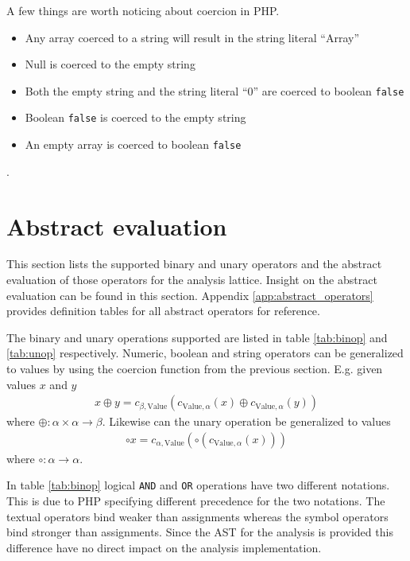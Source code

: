 A few things are worth noticing about coercion in PHP. 
\begin{itemize}
\item Any array coerced to a string will result in the string literal ``Array''
\item Null is coerced to the empty string
\item Both the empty string and the string literal ``0'' are coerced to boolean \texttt{false}
\item Boolean \texttt{false} is coerced to the empty string
\item An empty array is coerced to boolean \texttt{false}
\end{itemize}. 
\section{Abstract evaluation}
\label{sec:abseval}
This section lists the supported binary and unary operators and the abstract evaluation of those operators for the analysis lattice. Insight on the abstract evaluation can be found in this section. Appendix \ref{app:abstract_operators} provides definition tables for all abstract operators for reference.

The binary and unary operations supported are listed in table \ref{tab:binop} and \ref{tab:unop} respectively. Numeric, boolean and string operators can be generalized to values by using the coercion function from the previous section. E.g. given values $x$ and $y$
\begin{align*}
    x \oplus y =  c_{\beta, \text{Value}}(c_{\text{Value}, \alpha}(x) \oplus c_{\text{Value},\alpha}(y))
\end{align*}
where $\oplus : \alpha \times \alpha \rightarrow \beta$. Likewise can the unary operation be generalized to values 
\begin{align*}
    \circ x = c_{\alpha, \text{Value}}(\circ (c_{\text{Value}, \alpha}(x)))
\end{align*}
where $\circ : \alpha \rightarrow \alpha $.


In table \ref{tab:binop} logical \texttt{AND} and \texttt{OR} operations have two different notations. This is due to PHP specifying different precedence for the two notations. The textual operators bind weaker than assignments whereas the symbol operators bind stronger than assignments. Since the AST for the analysis is provided this difference have no direct impact on the analysis implementation.

